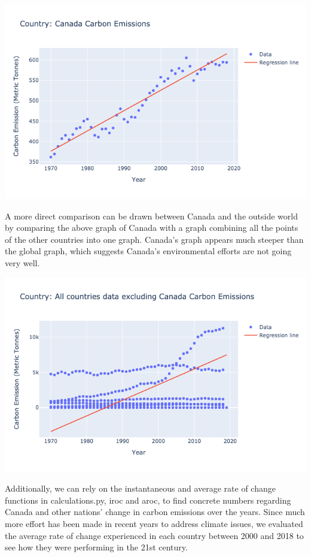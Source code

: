 \documentclass[fontsize=11pt]{article}
\begin{document}
    \includegraphics[scale=0.75]{canada_linear.png}

    A more direct comparison can be drawn between Canada and the outside world by comparing the above graph of Canada with a graph combining all the points of the other countries into one graph. Canada's graph appears much steeper than the global graph, which suggests Canada's environmental efforts are not going very well.

    \includegraphics[scale=0.6]{global_linear.png}

    Additionally, we can rely on the instantaneous and average rate of change functions in calculations.py, iroc and aroc, to find concrete numbers regarding Canada and other nations' change in carbon emissions over the years. Since much more effort has been made in recent years to address climate issues, we evaluated the average rate of change experienced in each country between 2000 and 2018 to see how they were performing in the 21st century.
\end{document}
